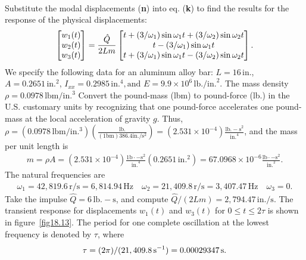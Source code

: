 \documentclass{AeroStructure-ERJohnson}
\begin{document}
\begin{example*}
\begin{align}
\end{align}
Substitute the modal displacements (\textbf{n}) into eq. (\textbf{k}) to find the results for the response of the physical displacements:
\begin{align}\label{ex18.2o}
\left[\begin{array}{@{}l@{}}w_{1}(t) \\w_{2}(t) \\w_{3}(t)\end{array}\right]=\frac{\hat{Q}}{2 L m}\left[\begin{array}{@{}c@{}}t+\left(3/\omega_{1}\right) \sin \omega_{1} t+\left(3/\omega_{2}\right) \sin \omega_{2} t \\t-\left(3/\omega_{1}\right) \sin \omega_{1} t \\t+\left(3/\omega_{1}\right) \sin \omega_{1} t-\left(3/\omega_{2}\right) \sin \omega_{2} t\end{array}\right].
\end{align}
We specify the following data for an aluminum alloy bar: $L=16\,\text{in.}$, $A=0.2651\,\text{in.}^{2}$, $I_{x x}=0.2985\,\text{in.}^{4}, \text{and } E=9.9 \times 10^{6}\,\text{lb./in.}^{2}$. The mass density $\rho=0.0978\,\mathrm{lbm}/ \mathrm{in.}^{3}$ Convert the pound-mass (lbm) to pound-force (lb.) in the U.S. customary units by recognizing that one pound-force accelerates one pound-mass at the local acceleration of gravity $g$. Thus, $\rho=(0.0978\,\mathrm{lbm}/ \mathrm{in.}^{3})\left(\frac{\mathrm{lb}.}{(1 \mathrm{bm}) 386.4 \mathrm{in}./\mathrm{s}^{2}}\right)=\left(2.531 \times 10^{-4}\right) \frac{\mathrm{lb.-s}^{2}}{\text{in.}^{4}}$, and the mass per unit length is
\begin{align}\label{ex18.2p}
m=\rho A=(2.531 \times 10^{-4}) \frac{1\mathrm{b} \cdot\!\mathrm{-s}^{2}}{\text{in.}^{4}}(0.2651\,\text{in.}^{2})=67.0968 \times 10^{-6} \frac{\mathrm{lb} \cdot\!\mathrm{-s}^{2}}{\text{in.}^{2}}.
\end{align}
The natural frequencies are
\begin{align}\label{ex18.2q}
\omega_{1}=42,819.6\,\mathrm{r}/\mathrm{s}=6,814.94\,\mathrm{Hz} \quad \omega_{2}=21,409.8\,\mathrm{r}/ \mathrm{s}=3,407.47\,\mathrm{Hz} \quad \omega_{3}=0.
\end{align}
Take the impulse $\hat{Q}=6\,\mathrm{lb.-s}$, and compute $\hat{Q}/(2 L m)=2,794.47\,\mathrm{in}./\mathrm{s}$. The transient response for displacements $w_{1}(t)$ and $w_{3}(t)$ for $0 \leq t \leq 2 \tau$ is shown in figure~\ref{fig18.13}. The period for one complete oscillation at the lowest frequency is denoted by $\tau$, where
\begin{align*}
\tau=(2 \pi) /(21,409.8\,\mathrm{s}^{-1})=0.00029347\,\mathrm{s}. \\[-1.45pc]
\text{\hfill\qed\hspace*{-143pt}}
\end{align*}
\end{example*}
\end{document}
